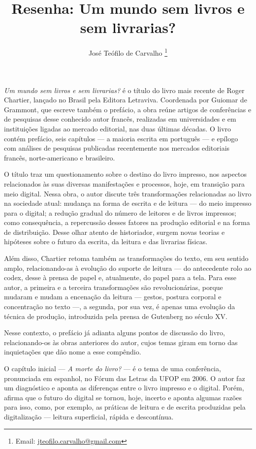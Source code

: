 \documentclass[portuguese]{textolivre}
\title{Resenha: Um mundo sem livros e sem livrarias?}
\author[1]{José Teófilo de Carvalho \orcid{0000-0003-4201-6214} \thanks{Email: \url{jteofilo.carvalho@gmail.com}}}
\affil[1]{Centro Federal de Educação Tecnológica de Minas Gerais, Belo Horizonte, MG, Brasil.}
\begin{document}
\maketitle

\begin{quote}
\end{quote}


\emph{Um mundo sem livros e sem livrarias?} é o título do livro mais recente de Roger Chartier, lançado no Brasil pela Editora Letraviva. Coordenada por Guiomar de Grammont, que escreve também o prefácio, a obra reúne artigos de conferências e de pesquisas desse conhecido autor francês, realizadas em universidades e em instituições ligadas ao mercado editorial, nas duas últimas décadas. O livro contém prefácio, seis capítulos — a maioria escrita em português — e epílogo com análises de pesquisas publicadas recentemente nos mercados editoriais francês, norte-americano e brasileiro.

O título traz um questionamento sobre o destino do livro impresso, nos aspectos relacionados às suas diversas manifestações e processos, hoje, em transição para meio digital. Nessa obra, o autor discute três transformações relacionadas ao livro na sociedade atual: mudança na forma de escrita e de leitura — do meio impresso para o digital; a redução gradual do número de leitores e de livros impressos; como consequência, a repercussão desses fatores na produção editorial e na forma de distribuição. Desse olhar atento de historiador, surgem novas teorias e hipóteses sobre o futuro da escrita, da leitura e das livrarias físicas.

Além disso, Chartier retoma também as transformações do texto, em seu sentido amplo, relacionando-as à evolução do suporte de leitura — do antecedente rolo ao codex, desse à prensa de papel e, atualmente, do papel para a tela. Para esse autor, a primeira e a terceira transformações são revolucionárias, porque mudaram e mudam a encenação da leitura — gestos, postura corporal e concentração no texto —, a segunda, por sua vez, é apenas uma evolução da técnica de produção, introduzida pela prensa de Gutenberg no século XV.

Nesse contexto, o prefácio já adianta alguns pontos de discussão do livro, relacionando-os às obras anteriores do autor, cujos temas giram em torno das inquietações que dão nome a esse compêndio.

O capítulo inicial — \emph{A morte do livro?} — é o tema de uma conferência, pronunciada em espanhol, no Fórum das Letras da UFOP em 2006. O autor faz um diagnóstico e aponta as diferenças entre o livro impresso e o digital. Porém, afirma que o futuro do digital se tornou, hoje, incerto e aponta algumas razões para isso, como, por exemplo, as práticas de leitura e de escrita produzidas pela digitalização — leitura superficial, rápida e descontínua.
\end{document}
